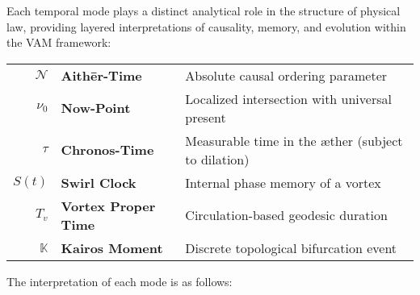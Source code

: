 \documentclass[preprint,notitlepage]{revtex4-2}
\begin{document}
Each temporal mode plays a distinct analytical role in the structure of physical law, providing layered interpretations of causality, memory, and evolution within the VAM framework:

\begin{center}
\begin{tcolorbox}[
  colback=gray!10,
  colframe=black,
  width=0.9\textwidth,
  sharp corners=southwest,
  boxrule=0.5pt,
  before skip=10pt,
  after skip=10pt,
  title=\textbf{Table: Ætheric Time Modes in the Vortex Æther Model},
  fonttitle=\bfseries,
]
\renewcommand{\arraystretch}{1.25}
    \small
        \begin{tabular}{r l l}
  \(\mathcal{N}\)     & \textbf{Aithēr-Time}         & Absolute causal ordering parameter \\
  \(\nu_0\)           & \textbf{Now-Point}           & Localized intersection with universal present \\
  \(\tau\)            & \textbf{Chronos-Time}        & Measurable time in the æther (subject to dilation) \\
  \(S(t)\)            & \textbf{Swirl Clock}         & Internal phase memory of a vortex \\
  \(T_v\)             & \textbf{Vortex Proper Time}  & Circulation-based geodesic duration \\
  \(\mathbb{K}\)      & \textbf{Kairos Moment}       & Discrete topological bifurcation event \\
\end{tabular}
\end{tcolorbox}
\end{center}

\noindent The interpretation of each mode is as follows:
\end{document}
